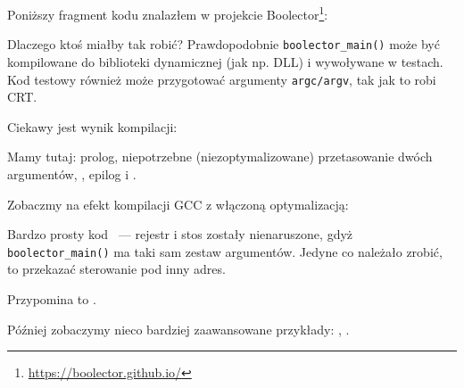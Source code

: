 \label{Boolector}

Poniższy fragment kodu znalazłem w projekcie Boolector\footnote{\url{https://boolector.github.io/}}:



Dlaczego ktoś miałby tak robić? Prawdopodobnie \verb|boolector_main()| może być kompilowane do biblioteki dynamicznej (jak np. DLL) i wywoływane w testach. Kod testowy również może przygotować argumenty \verb|argc/argv|, tak jak to robi \ac{CRT}.

Ciekawy jest wynik kompilacji:



Mamy tutaj: prolog, niepotrzebne (niezoptymalizowane) przetasowanie dwóch argumentów, , epilog i .

Zobaczmy na efekt kompilacji GCC z włączoną optymalizacją:



Bardzo prosty kod ~--- rejestr i stos zostały nienaruszone, gdyż \verb|boolector_main()| ma taki sam zestaw argumentów. Jedyne co należało zrobić, to przekazać sterowanie pod inny adres.

Przypomina to .

Później zobaczymy nieco bardziej zaawansowane przykłady: , .

